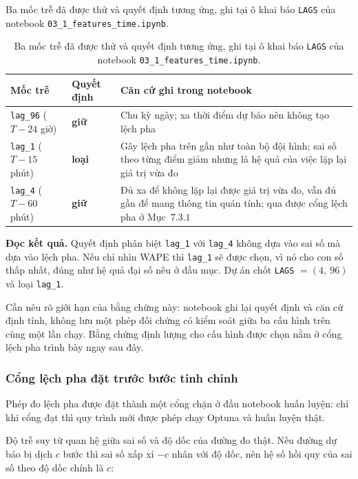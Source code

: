 \documentclass[12pt, a4paper]{report}
\begin{document}
\begin{table}[htbp]
\centering
\caption{Ba mốc trễ đã được thử và quyết định tương ứng, ghi tại ô khai báo \texttt{LAGS} của
notebook \texttt{03\_1\_features\_time.ipynb}.}
\label{tab:chon_lag}
\small
\begin{tabular}{@{}L{3.4cm} L{3.6cm} L{7.0cm}@{}}
\toprule
\textbf{Mốc trễ} & \textbf{Quyết định} & \textbf{Căn cứ ghi trong notebook} \\
\midrule
\texttt{lag\_96} ($T-24$ giờ) & \textbf{giữ} &
Chu kỳ ngày; xa thời điểm dự báo nên không tạo lệch pha \\
\addlinespace
\texttt{lag\_1} ($T-15$ phút) & \textbf{loại} &
Gây lệch pha trên gần như toàn bộ đội hình; sai số theo từng điểm giảm nhưng là hệ quả của
việc lặp lại giá trị vừa đo \\
\addlinespace
\texttt{lag\_4} ($T-60$ phút) & \textbf{giữ} &
Đủ xa để không lặp lại được giá trị vừa đo, vẫn đủ gần để mang thông tin quán tính; qua được
cổng lệch pha ở Mục~$7.3.1$ \\
\bottomrule
\end{tabular}
\caption[Ba mốc trễ đã được thử và quyết định tương ứng, ghi tại ô khai báo \texttt{LAGS} của notebook]{Ba mốc trễ đã được thử và quyết định tương ứng, ghi tại ô khai báo \texttt{LAGS} của
notebook \texttt{03\_1\_features\_time.ipynb}.}
\label{tab:chon_lag}
\end{table}

\textbf{Đọc kết quả.} Quyết định phân biệt \texttt{lag\_1} với \texttt{lag\_4} không dựa vào
sai số mà dựa vào lệch pha. Nếu chỉ nhìn WAPE thì \texttt{lag\_1} sẽ được chọn, vì
nó cho con số thấp nhất, đúng như hệ quả đại số nêu ở đầu mục. Dự án chốt \texttt{LAGS}
$= (4,\ 96)$ và loại \texttt{lag\_1}.

Cần nêu rõ giới hạn của bằng chứng này: notebook ghi lại quyết định và căn
cứ định tính, không lưu một phép đối chứng có kiểm soát giữa ba cấu hình trên cùng một lần
chạy. Bằng chứng định lượng cho cấu hình được chọn nằm ở cổng lệch pha trình bày ngay sau
đây.

\subsubsection{Cổng lệch pha đặt trước bước tinh chỉnh}

Phép đo lệch pha được đặt thành một cổng chặn ở đầu notebook huấn luyện: chỉ khi cổng đạt
thì quy trình mới được phép chạy Optuna và huấn luyện thật.

Độ trễ suy từ quan hệ giữa sai số và độ dốc của đường đo thật. Nếu đường dự báo bị dịch
$c$ bước thì sai số xấp xỉ $-c$ nhân với độ dốc, nên hệ số hồi quy của sai số theo độ dốc
chính là $c$:
\end{document}
